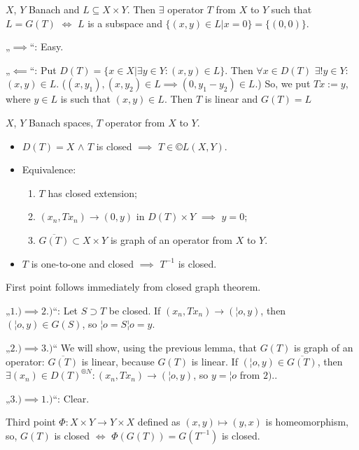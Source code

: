 \documentclass[12pt]{article}					%
\begin{document}
\begin{lemma}
	$X$, $Y$ Banach and $L \subseteq X \times Y$. Then $\exists$ operator $T$ from $X$ to $Y$ such that $L = G(T)$ $\Leftrightarrow$ $L$ is a subspace and $\{(x, y) \in L | x = 0\} = \{(0, 0)\}$.

	\begin{dukazin}
		„$\implies$“: Easy.

		„$\impliedby$“: Put $D(T) = \{x \in X | \exists y \in Y: (x, y) \in L\}$. Then $\forall x \in D(T)$ $\exists! y \in Y$: $(x, y) \in L$. ($(x, y_1), (x, y_2) \in L \implies (0, y_1 - y_2) \in L$.) So, we put $Tx := y$, where $y \in L$ is such that $(x, y) \in L$. Then $T$ is linear and $G(T) = L$
	\end{dukazin}
\end{lemma}

\begin{tvrzeni}
	$X$, $Y$ Banach spaces, $T$ operator from $X$ to $Y$.

	\begin{itemize}
		\item $D(T) = X$ $\land$ $T$ is closed $\implies$ $T \in ©L(X, Y)$.
		\item Equivalence:
			\begin{enumerate}
				\item $T$ has closed extension;
				\item $(x_n, T x_n) \rightarrow (0, y)$ in $D(T) \times Y$ $\implies$ $y = 0$;
				\item $\overline{G(T)} \subset X \times Y$ is graph of an operator from $X$ to $Y$.
			\end{enumerate}
		\item $T$ is one-to-one and closed $\implies$ $T^{-1}$ is closed.
	\end{itemize}

	\begin{dukazin}
		First point follows immediately from closed graph theorem.

		„$1.) \implies 2.)$“: Let $S \supset T$ be closed. If $(x_n, T x_n) \rightarrow (¦o, y)$, then $(¦o, y) \in G(S)$, so $¦o = S ¦o = y$.

		„$2.) \implies 3.)$“ We will show, using the previous lemma, that $G(T)$ is graph of an operator: $\overline{G(T)}$ is linear, because $G(T)$ is linear. If $(¦o, y) \in \overline{G(T)}$, then $\exists (x_n) \in D(T)^{®N}: (x_n, T x_n) \rightarrow (¦o, y)$, so $y = ¦o$ from $2).$.

		„$3.) \implies 1.)$“: Clear.

		Third point $Φ: X \times Y \rightarrow Y \times X$ defined as $(x, y) \mapsto (y, x)$ is homeomorphism, so, $G(T)$ is closed $\Leftrightarrow$ $Φ(G(T)) = G(T^{-1})$ is closed.
	\end{dukazin}
\end{tvrzeni}
\end{document}
